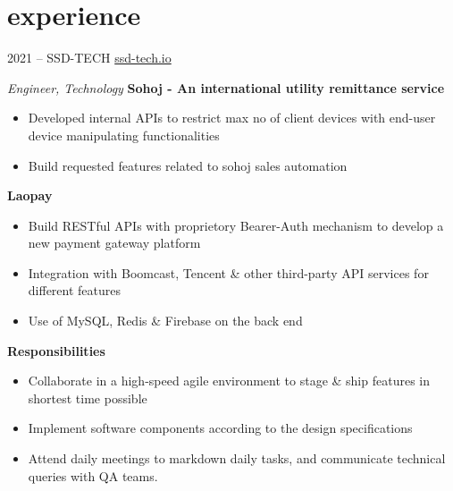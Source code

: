 \section{experience}
\begin{entrylist}

	\entry
	{2021 -- }
	{SSD-TECH}
	{\href{https://ssd-tech.io}{ssd-tech.io}}
	{\emph{Engineer, Technology} \newline
		\textbf{Sohoj - An international utility remittance service}
		\begin{itemize}
			\item Developed internal APIs to restrict max no of client devices with end-user device manipulating functionalities
			\item Build requested features related to sohoj sales automation
		\end{itemize}
		\textbf{Laopay}
		\begin{itemize}
			\item Build RESTful APIs with proprietory Bearer-Auth mechanism to develop a new payment gateway platform
			\item Integration with Boomcast, Tencent \& other third-party API services for different features
			\item Use of MySQL, Redis \& Firebase on the back end
		\end{itemize}
		\textbf{Responsibilities}
		\begin{itemize}
			\item Collaborate in a high-speed agile environment to stage \& ship features in shortest time possible
			\item Implement software components according to the design specifications
			\item Attend daily meetings to markdown daily tasks, and communicate technical queries with QA teams.
		\end{itemize}
	}

\end{entrylist}